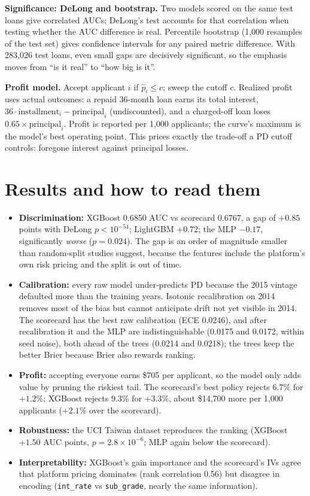 \documentclass[a4paper,11pt]{article}
\newcommand{\term}[1]{\textbf{#1}}
\begin{document}
\term{Significance: DeLong and bootstrap.} Two models scored on the same test loans give correlated AUCs; DeLong's test accounts for that correlation when testing whether the AUC difference is real. Percentile bootstrap (1{,}000 resamples of the test set) gives confidence intervals for any paired metric difference. With 283{,}026 test loans, even small gaps are decisively significant, so the emphasis moves from ``is it real'' to ``how big is it''.

\term{Profit model.} Accept applicant $i$ if $\hat p_i\le c$; sweep the cutoff $c$. Realized profit uses actual outcomes: a repaid 36-month loan earns its total interest, $36\cdot\text{installment}_i-\text{principal}_i$ (undiscounted), and a charged-off loan loses $0.65\times\text{principal}_i$. Profit is reported per 1{,}000 applicants; the curve's maximum is the model's best operating point. This prices exactly the trade-off a PD cutoff controls: foregone interest against principal losses.

\section{Results and how to read them}

\begin{itemize}[itemsep=2pt]
\item \term{Discrimination:} XGBoost 0.6850 AUC vs scorecard 0.6767, a gap of $+0.85$ points with DeLong $p<10^{-54}$; LightGBM $+0.72$; the MLP $-0.17$, significantly \emph{worse} ($p=0.024$). The gap is an order of magnitude smaller than random-split studies suggest, because the features include the platform's own risk pricing and the split is out of time.
\item \term{Calibration:} every raw model under-predicts PD because the 2015 vintage defaulted more than the training years. Isotonic recalibration on 2014 removes most of the bias but cannot anticipate drift not yet visible in 2014. The scorecard has the best raw calibration (ECE 0.0246), and after recalibration it and the MLP are indistinguishable (0.0175 and 0.0172, within seed noise), both ahead of the trees (0.0214 and 0.0218); the trees keep the better Brier because Brier also rewards ranking.
\item \term{Profit:} accepting everyone earns \$705 per applicant, so the model only adds value by pruning the riskiest tail. The scorecard's best policy rejects 6.7\% for $+1.2\%$; XGBoost rejects 9.3\% for $+3.3\%$, about \$14{,}700 more per 1{,}000 applicants ($+2.1\%$ over the scorecard).
\item \term{Robustness:} the UCI Taiwan dataset reproduces the ranking (XGBoost $+1.50$ AUC points, $p=2.8\times10^{-6}$; MLP again below the scorecard).
\item \term{Interpretability:} XGBoost's gain importance and the scorecard's IVs agree that platform pricing dominates (rank correlation 0.56) but disagree in encoding (\texttt{int\_rate} vs \texttt{sub\_grade}, nearly the same information).
\end{itemize}
\end{document}
